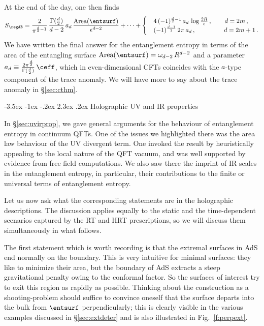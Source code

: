 \documentclass[12pt,openany]{book}
\makeatletter
\renewcommand\section{\@startsection {section}{1}{\z@}%
                                   {-3.5ex \@plus -1ex \@minus -.2ex}%
                                   {2.3ex \@plus.2ex}%
                                   {\normalfont\large\bfseries}}
\makeatother
\begin{document}
At the end of the day, one then finds
%
\begin{equation}
S_{\regAB} = \frac{2}{\pi^{\frac{d}{2}-1}}\, \frac{\Gamma(\frac{d}{2})}{d-2} \, a_d\, \frac{\text{Area}(\entsurf)}{\epsilon^{d-2}} + \cdots +
\begin{cases}
& 4\, (-1)^{\frac{d}{2}-1} \, a_d\, \log\frac{2R}{\epsilon} \,, \qquad d = 2m\,,\\
& (-1)^{\frac{d-1}{2}}\, 2\pi\, a_d\,, \qquad\qquad  \;\,d = 2m+1\,.
\end{cases}
\label{eq:sball}
\end{equation}
%
We have written the final answer for the entanglement entropy in terms of the area of the entangling surface
 $\text{Area}(\entsurf) = \omega_{d-2}\, R^{d-2}$ and a parameter
 $a_d\equiv \frac{2\pi^\frac{d}{2}}{\Gamma(\frac{d}{2})} \, \ceff$, which in even-dimensional CFTs coincides with the $a$-type component of the trace anomaly. We will have more to say about the trace anomaly in \S\ref{sec:cthm}.


\section{Holographic UV and IR properties}
\label{sec:holuvir}

In \S\ref{sec:uvirprop}, we gave general arguments for the behaviour of entanglement entropy in continuum QFTs. One of the issues we highlighted there was the area law behaviour of the UV divergent term. One invoked the result by
heuristically appealing to the local nature of the QFT vacuum, and  was well supported by evidence from free field computations. We also saw there the imprint of IR scales in the entanglement entropy, in particular, their contributions to the finite or universal terms of entanglement entropy.

Let us now ask what the corresponding statements are in the holographic descriptions. The discussion applies equally to the static and the time-dependent scenarios captured by the RT and HRT prescriptions, so we will discuss them simultaneously in what follows.

The first statement which is worth recording is that the extremal surfaces in AdS end normally on the boundary. This is very intuitive for minimal surfaces: they like to minimize their area, but the boundary of AdS extracts a steep gravitational penalty owing to the conformal factor. So the surfaces of interest try to exit this region as rapidly as possible. Thinking about the construction as a shooting-problem should suffice to convince oneself that the surface departs into the bulk from $\entsurf$ perpendicularly; this is  clearly visible in the various examples discussed in \S\ref{sec:extdeter} and is also illustrated  in Fig.~\ref{f:perpext}.
\end{document}
